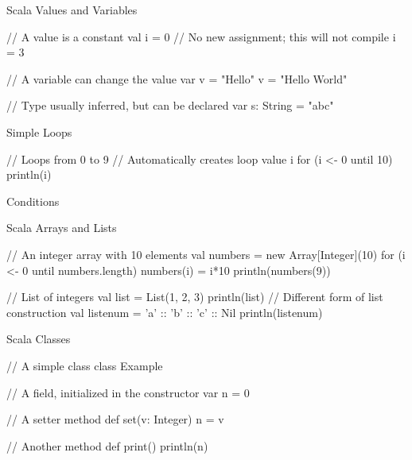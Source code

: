 \documentclass[xcolor=pdflatex,dvipsnames,table]{beamer}
\begin{document}
\begin{frame}[fragile]{Scala Values and Variables}
\begin{chisel}
// A value is a constant
val i = 0
// No new assignment; this will not compile
i = 3

// A variable can change the value
var v = "Hello"
v = "Hello World"

// Type usually inferred, but can be declared
var s: String = "abc"
\end{chisel}
\end{frame}

\begin{frame}[fragile]{Simple Loops}
\begin{chisel}
// Loops from 0 to 9
// Automatically creates loop value i
for (i <- 0 until 10) {
  println(i)
}
\end{chisel}
\end{frame}

\begin{frame}[fragile]{Conditions}
\end{frame}

\begin{frame}[fragile]{Scala Arrays and Lists}
\begin{chisel}
// An integer array with 10 elements
val numbers = new Array[Integer](10)
for (i <- 0 until numbers.length) {
  numbers(i) = i*10
}
println(numbers(9))


// List of integers
val list = List(1, 2, 3)
println(list)
// Different form of list construction
val listenum = 'a' :: 'b' :: 'c' :: Nil
println(listenum)
\end{chisel}
\end{frame}


\begin{frame}[fragile]{Scala Classes}
\begin{chisel}
// A simple class
class Example {
  // A field, initialized in the constructor
  var n = 0
  
  // A setter method
  def set(v: Integer) {
    n = v
  }
  
  // Another method
  def print() {
    println(n)
  }
}
\end{chisel}
\end{frame}
\end{document}
